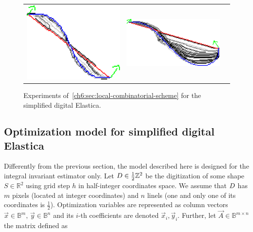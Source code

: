\begin{figure}[]
\begin{tabular}{ccc}
\includegraphics[scale=0.25]{figures/chapter5/fixed-orientations/selastica/len_pen_0.01/curve-2/summary.pdf} &
\includegraphics[scale=0.25]{figures/chapter5/fixed-orientations/selastica/len_pen_0.01/curve-3/summary.pdf}
\end{tabular}
\caption{Experiments of~\cref{ch6:sec:local-combinatorial-scheme} for the simplified digital Elastica.}
\label{fig:simplified-elastica}
\end{figure}


\subsection{Optimization model for simplified digital Elastica}
\label{ch6:subsec:optimization-model-simplified-digital-elastica}

Differently from the previous section, the model described here is designed for the integral invariant estimator only. Let $D \in \frac{1}{2}\mathbb{Z}^2$ be the digitization of some shape $S \in \mathbb{R}^2$ using grid step $h$ in half-integer coordinates space. We assume that $D$ has $m$ pixels (located at integer coordinates) and $n$ linels (one and only one of its coordinates is $\frac{1}{2}$). Optimization variables are represented as column vectors $\vec{x} \in \mathbb{B}^{m},\, \vec{y} \in \mathbb{B}^{n}$ and its $i$-th coefficients are denoted  $\vec{x}_i,\vec{y}_i$.  Further, let $\vec{A} \in \mathbb{B}^{m\times n}$ the matrix defined as

